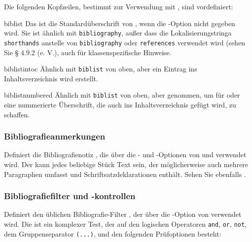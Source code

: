 \documentclass{ltxdockit}[2011/03/25]
\begin{document}
Die folgenden Kopfzeilen, bestimmt zur Verwendung mit ,
sind vordefiniert:

\begin{valuelist*}

\item[biblist]
Das ist die Standardüberschrift von , wenn die
-Option nicht gegeben wird.  Sie ist ähnlich mit \texttt{bibliography}, außer dass die Lokalisierungstringa \texttt{shorthands} anstelle von  \texttt{bibliography} oder \texttt{references} verwendet wird (sehen Sie § 4.9.2 (e. V.),
auch  für klassenspezifische Hinweise.

\item[biblistintoc]
Ähnlich mit \texttt{biblist} von oben, aber ein Eintrag ins Inhaltsverzeichnis wird erstellt.

\item[biblistnumbered]
Ähnlich mit \texttt{biblist} von oben, aber genommen, um für  oder  eine nummerierte Überschrift, die auch ins Inhaltsverzeichnis gefügt wird,
zu schaffen.

\end{valuelist*}


\subsubsection{Bibliografieanmerkungen} \label{use:bib:nts}

\begin{ltxsyntax}


Definiert die Bibliografienotiz , die über die - und
-Optionen von  und 
verwendet wird. Der  kann jedes beliebige Stück Text sein, der
möglicherweise auch mehrere Paragraphen umfasst und Schriftsatzdeklarationen
enthält. Sehen Sie ebenfalls .

\end{ltxsyntax}

\subsubsection{Bibliografiefilter und -kontrollen} \label{use:bib:flt}

\begin{ltxsyntax}


Definiert den üblichen Bibliografie-Filter , der über die
-Option von  verwendet wird. Die
 ist ein komplexer Test, der auf den logischen Operatoren
\texttt{and}, \texttt{or}, \texttt{not}, dem Gruppenseparator \texttt{(...)},
und den folgenden Prüfoptionen besteht:

\end{ltxsyntax}
\end{document}
